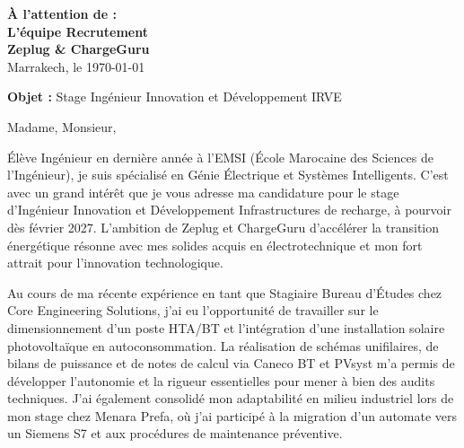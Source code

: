\documentclass[10pt,a4paper]{../../altacv}
\makeatletter
\renewcommand{\makecvheader}{%
  \begingroup
    \raggedright\color{emphasis}%
    {\Huge\bfseries\MakeUppercase{\@name}\par}
    \medskip
    {\large\bfseries\color{accent}\@tagline\par}
    \medskip
    {\footnotesize\bfseries\@personalinfo\par}
  \endgroup\medskip
}
\makeatother
\begin{document}

\makecvheader

\bigskip
\medskip

\begin{flushright}
  {\color{emphasis}\textbf{À l'attention de :}} \\[2pt]
  \textbf{L'équipe Recrutement} \\
  \textbf{Zeplug \& ChargeGuru} \\[20pt]
  Marrakech, le \today
\end{flushright}
\bigskip

\bigskip

{\color{accent}\textbf{Objet :}} Stage Ingénieur Innovation et Développement IRVE
\bigskip\bigskip

Madame, Monsieur,

\vspace{0.4cm}

Élève Ingénieur en dernière année à l'EMSI (École Marocaine des Sciences de l'Ingénieur), je suis spécialisé en Génie Électrique et Systèmes Intelligents. C'est avec un grand intérêt que je vous adresse ma candidature pour le stage d'Ingénieur Innovation et Développement Infrastructures de recharge, à pourvoir dès février 2027. L'ambition de Zeplug et ChargeGuru d'accélérer la transition énergétique résonne avec mes solides acquis en électrotechnique et mon fort attrait pour l'innovation technologique.

\vspace{0.4cm}

Au cours de ma récente expérience en tant que Stagiaire Bureau d'Études chez Core Engineering Solutions, j'ai eu l'opportunité de travailler sur le dimensionnement d'un poste HTA/BT et l'intégration d'une installation solaire photovoltaïque en autoconsommation. La réalisation de schémas unifilaires, de bilans de puissance et de notes de calcul via Caneco BT et PVsyst m'a permis de développer l'autonomie et la rigueur essentielles pour mener à bien des audits techniques. J'ai également consolidé mon adaptabilité en milieu industriel lors de mon stage chez Menara Prefa, où j'ai participé à la migration d'un automate vers un Siemens S7 et aux procédures de maintenance préventive.
\end{document}
